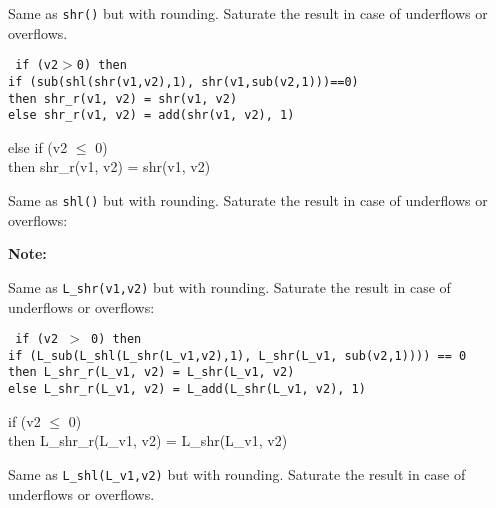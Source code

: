 
Same as {\tt shr()} but with rounding. Saturate the result in case
of underflows or overflows.

{\tt
{} if (v2$>$0) then\\
    if (sub(shl(shr(v1,v2),1), shr(v1,sub(v2,1)))==0) \\
    then shr\_r(v1, v2) = shr(v1, v2)\\
    else shr\_r(v1, v2) = add(shr(v1, v2), 1)

 else if (v2 $\leq$ 0) \\
    then shr\_r(v1, v2) = shr(v1, v2)}


Same as {\tt shl()} but with rounding. Saturate the result in case
of underflows or overflows:


\textbf{Note:} \hfill {}



Same as {\tt L\_shr(v1,v2)} but with rounding. Saturate the result
in case of underflows or overflows:

{\tt
{} if (v2 $>$ 0) then\\
   if (L\_sub(L\_shl(L\_shr(L\_v1,v2),1), L\_shr(L\_v1, sub(v2,1)))) == 0 \\
   then L\_shr\_r(L\_v1, v2) = L\_shr(L\_v1, v2)\\
   else L\_shr\_r(L\_v1, v2) = L\_add(L\_shr(L\_v1, v2), 1)

 if (v2 $\leq$ 0) \\
   then L\_shr\_r(L\_v1, v2) = L\_shr(L\_v1, v2)}


Same as {\tt L\_shl(L\_v1,v2)} but with rounding. Saturate the
result in case of underflows or overflows.


